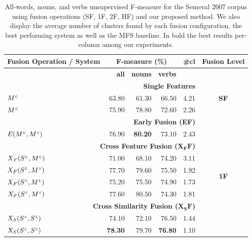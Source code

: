 \begin{table}[htp!]
\centering
\setlength\tabcolsep{3pt}
\caption{All-words, nouns, and verbs unsupervised F-measure for the Semeval 2007 corpus using fusion operations (SF, 1F, 2F, HF) and our proposed method. We also display the average number of clusters found by each fusion configuration, the best performing system as well as the MFS baseline. In bold the best results per-column among our experiments.}
\label{tab:sem2007_PM_unsup_FS}
\begin{tabular}{@{}lrrrrc@{}}
\toprule
\textbf{Fusion Operation / System} & \multicolumn{3}{c}{\textbf{F-measure (\%)}} & \#\textbf{cl} & \textbf{Fusion Level}\\ \midrule
      	& \textbf{all}          & \textbf{nouns}          & \textbf{verbs}           \\ 
       \midrule
       \multicolumn{5}{r}{\textbf{Single Features}} & \multirow{3}{*}{\textbf{SF}}\\ %
       $M^{\scriptscriptstyle L}$                    &	63.80	 & 61.30 & 66.50 & 4.21\\
 

       $M^{\scriptscriptstyle S}$                    &	75.90	& 78.80 & 72.60 & 2.26\\
       \midrule
       \multicolumn{5}{r}{\textbf{Early Fusion (EF)}}  & \multirow{10}{*}{\textbf{1F}}     \\ %
       $E(M^{\scriptscriptstyle L}, M^{\scriptscriptstyle S})$		&	76.90	& \textbf{80.20} & 73.10 & 2.43\\
       \multicolumn{5}{r}{\textbf{Cross Feature Fusion ($\mathbf{X_FF}$)}}       \\ %
	   
	   $X_F(S^{\scriptscriptstyle L}, M^{\scriptscriptstyle L})$		&	71.00	& 68.10 & 74.20 & 3.11 \\	   
       $X_F(S^{\scriptscriptstyle L}, M^{\scriptscriptstyle S})$		&	77.70	& 79.60 & 75.50 & 1.92 \\
	   $X_F(S^{\scriptscriptstyle S}, M^{\scriptscriptstyle L})$		&	75.20	& 75.50 & 74.90	 & 1.73 \\	   
       $X_F(S^{\scriptscriptstyle S}, M^{\scriptscriptstyle S})$		&	77.60	& 80.50 & 74.30 & 1.81 \\       
       \multicolumn{5}{r}{\textbf{Cross Similarity Fusion ($\mathbf{X_SF}$)}}       \\ %
	   
 
	   $X_S(S^{\scriptscriptstyle S}, S^{\scriptscriptstyle L})$		&	74.10	& 72.10 & 76.50 & 1.44 \\
	   $X_S(S^{\scriptscriptstyle L}, S^{\scriptscriptstyle S})$		&	\textbf{78.30}	& 79.70  & \textbf{76.80} & 1.10 \\
	  

\end{tabular}
\end{table}
